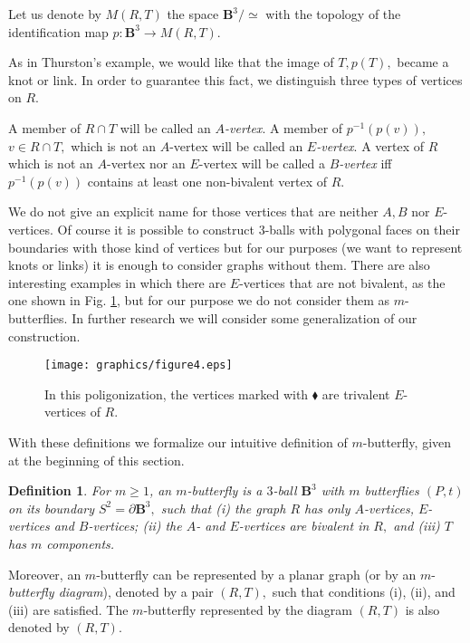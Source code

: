 \documentclass{amsproc}\usepackage{eurosym}
\theoremstyle{plain}
\newtheorem{definition}{Definition}
\numberwithin{equation}{section}
\begin{document}
Let us denote by $M(R,T)$ the space $\mathbf{B}^{3}/\simeq$ with the topology
of the identification map $p:\mathbf{B}^{3}\rightarrow M(R,T)$.

As in Thurston's example, we would like that the image of $T,p(T),$ became a knot or link. In
order to guarantee this fact, we distinguish three types of vertices on $R.$

A member of $R\cap T$ will be called an $A$\emph{-vertex}. A member of
$p^{-1}\left(  p\left(  v\right)  \right)  ,$ $v\in R\cap T,$ which is not an
$A$-vertex will be called an $E$\emph{-vertex}. A vertex of $R$ which is not
an $A$-vertex nor an $E$-vertex will be called a $B$\emph{-vertex }iff
$p^{-1}\left(  p\left(  v\right)  \right)  $ contains at least one
non-bivalent vertex of $R$.

We do not give an explicit name for those vertices that are neither $A,B$ nor
$E$-vertices. Of course it is possible to construct $3$-balls with polygonal
faces on their boundaries with those kind of vertices but for our purposes (we
want to represent knots or links) it is enough to consider graphs without
them. There are also interesting examples in which there are $E$-vertices that
are not bivalent, as the one shown in Fig. \ref{exemike}, but for our purpose
we do not consider them as $m$-butterflies. In further research we will
consider some generalization of our construction.
\begin{figure}
[h]
\begin{center}
\texttt{[image: graphics/figure4.eps]}\caption{In this poligonization, the vertices marked with $\blacklozenge$ are
trivalent $E$-vertices of $R$. }\label{exemike}\end{center}
\end{figure}



With these definitions we formalize our intuitive definition of $m$-butterfly,
given at the beginning of this section.

\begin{definition}
For $m\geq1$, an $m$-\textit{butterfly} is a $3$-ball $\mathbf{B}^{3}$ with
$m$ butterflies $(P,t)$ on its boundary $S^{2}=\partial\mathbf{B}^{3},$ such
that (i) the graph $R$ has only $A$-vertices, $E$-vertices and $B$-vertices;
(ii) the $A$- and $E$-vertices are bivalent in $R,$ and (iii) $T$ has $m$ components.
\end{definition}

Moreover, an $m$-butterfly can be represented by a planar graph (or by an
$m$-\textit{butterfly diagram}), denoted by a pair $\left(  R,T\right)  ,$
such that conditions (i), (ii), and (iii) are satisfied. The $m$-butterfly
represented by the diagram $(R,T)$ is also denoted by $(R,T).$
\end{document}
